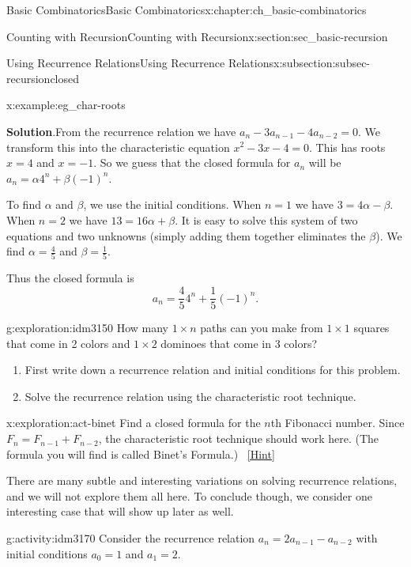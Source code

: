 \documentclass[oneside,10pt,]{book}
\numberwithin{equation}{chapter}
\begin{document}
\begin{chapterptx}{Basic Combinatorics}{}{Basic Combinatorics}{}{}{x:chapter:ch_basic-combinatorics}
\begin{sectionptx}{Counting with Recursion}{}{Counting with Recursion}{}{}{x:section:sec_basic-recursion}
\begin{subsectionptx}{Using Recurrence Relations}{}{Using Recurrence Relations}{}{}{x:subsection:subsec-recursionclosed}
\begin{example}{}{x:example:eg_char-roots}
\par\smallskip%
\noindent\textbf{Solution}.\hypertarget{g:solution:idm3130}{}\quad{}From the recurrence relation we have \(a_n - 3a_{n-1} - 4a_{n-2} = 0\).  We transform this into the characteristic equation \(x^2 - 3x - 4 = 0\). This has roots \(x = 4\) and \(x = -1\).  So we guess that the closed formula for \(a_n\) will be \(a_n = \alpha 4^n + \beta (-1)^n\).%
\par
To find \(\alpha\) and \(\beta\), we use the initial conditions.   When \(n = 1\) we have \(3 = 4\alpha -\beta\).  When \(n = 2\) we have \(13 = 16\alpha + \beta\).  It is easy to solve this system of two equations and two unknowns (simply adding them together eliminates the \(\beta\)).  We find \(\alpha = \frac{4}{5}\) and \(\beta = \frac{1}{5}\).%
\par
Thus the closed formula is%
\begin{equation*}
a_n = \frac{4}{5} 4^n + \frac{1}{5} (-1)^n\text{.}
\end{equation*}
%
\end{example}
\begin{exploration}{}{g:exploration:idm3150}%
How many \(1\times n\) paths can you make from \(1\times 1\) squares that come in 2 colors and \(1\times 2\) dominoes that come in 3 colors?%
\begin{enumerate}[font=\bfseries,label=(\alph*),ref=\alph*]
\item{}First write down a recurrence relation and initial conditions for this problem.%
\item{}Solve the recurrence relation using the characteristic root technique.%
\end{enumerate}
\end{exploration}
\begin{exploration}{}{x:exploration:act-binet}%
Find a closed formula for the \(n\)th Fibonacci number.  Since \(F_n = F_{n-1} + F_{n-2}\), the characteristic root technique should work here.  (The formula you will find is called Binet's Formula.)%
\qquad~\hfill{\tiny\hyperlink{g:hint:idm3165-back}{[Hint]}}\end{exploration}
There are many subtle and interesting variations on solving recurrence relations, and we will not explore them all here.  To conclude though, we consider one interesting case that will show up later as well.%
\begin{activity}{}{g:activity:idm3170}%
Consider the recurrence relation \(a_n = 2a_{n-1} - a_{n-2}\) with initial conditions \(a_0 = 1\) and \(a_1 = 2\).%
\begin{enumerate}[font=\bfseries,label=(\alph*),ref=\alph*]

\end{enumerate}
\end{activity}
\end{subsectionptx}
\end{sectionptx}
\end{chapterptx}
\end{document}
